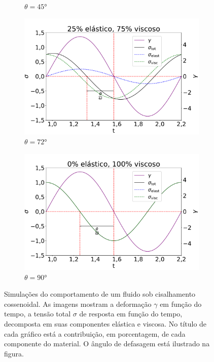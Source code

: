 \begin{figure}[h]
\begin{subfigure}[t]{0.3\textwidth}
					\caption{\(\theta=45°\)}
					\label{fig:osc_sim50}
				\end{subfigure}
			
				\hspace{2.5cm} \begin{subfigure}[t]{0.3\textwidth}
					\centering
					\includegraphics[width=\textwidth]{./imagens/reologia/Simulacao_visc_75}
					\caption{\(\theta=72°\)}
					\label{fig:osc_sim75}
				\end{subfigure}%
				\begin{subfigure}[t]{0.3\textwidth}
					\centering
					\includegraphics[width=\textwidth]{./imagens/reologia/Simulacao_visc_100}
					\caption{\(\theta=90°\)}
					\label{fig:osc_sim100}
				\end{subfigure}%
			\caption{Simulações do comportamento de um fluido sob cisalhamento cossenoidal. As imagens mostram a deformação \(\gamma\) em função do tempo, a tensão total \(\sigma\) de resposta em função do tempo, decomposta em suas componentes elástica e viscosa. No título de cada gráfico está a contribuição, em porcentagem, de cada componente do material. O ângulo de defasagem está ilustrado na figura.}
			\label{fig:osc_simulacoes}
			\end{figure} 
			
